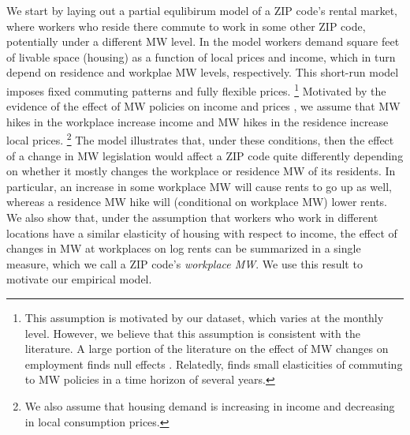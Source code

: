 We start by laying out a partial equlibirum model of a ZIP code's rental market, 
where workers who reside there commute to work in some other ZIP code, potentially 
under a different MW level.
In the model workers demand square feet of livable space (housing) as a function
of local prices and income, which in turn depend on residence and workplae MW 
levels, respectively.
This short-run model imposes fixed commuting patterns and fully flexible prices.%
\footnote{This assumption is motivated by our dataset, which varies at the monthly
level. However, we believe that this assumption is consistent with the literature. 
A large portion of the literature on the effect of MW changes on employment finds 
null effects \parencite[see][for a review]{Dube2019}.
Relatedly, \textcite{PerezPerez2021} finds small elasticities of commuting to MW 
policies in a time horizon of several years.}
Motivated by the evidence of the effect of MW policies on income and prices 
\parencite{AllegrettoReich2018,Leung2021}, we assume that MW hikes in the workplace 
increase income and MW hikes in the residence increase local prices.%
\footnote{We also assume that housing demand is increasing in income and decreasing
in local consumption prices.}
The model illustrates that, under these conditions, then the effect of a change in 
MW legislation would affect a ZIP code quite differently depending on whether it 
mostly changes the workplace or residence MW of its residents.
In particular, an increase in some workplace MW will cause rents to go up as well, 
whereas a residence MW hike will (conditional on workplace MW) lower rents.
We also show that, under the assumption that workers who work in different locations
have a similar elasticity of housing with respect to income, the effect of changes in
MW at workplaces on log rents can be summarized in a single measure, which we call
a ZIP code's \textit{workplace MW}.
We use this result to motivate our empirical model.


